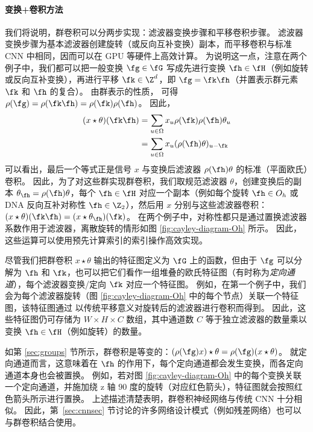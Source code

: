 \paragraph{变换+卷积方法}
我们将说明，群卷积可以分两步实现：滤波器变换步骤和平移卷积步骤。
滤波器变换步骤为基本滤波器创建旋转（或反向互补变换）副本，而平移卷积与标准 CNN 中相同，因而可以在 GPU 等硬件上高效计算。%
为说明这一点，注意在两个例子中，我们都可以把一般变换 $\fg \in \fG$ 写成先进行变换 $\fh \in \fH$（例如旋转或反向互补变换），再进行平移 $\fk \in \Z^d$，即 $\fg = \fk \fh$（并置表示群元素 $\fk$ 和 $\fh$ 的复合）。
由群表示的性质，%
可得 $\rho(\fg) = \rho(\fk \fh) = \rho(\fk) \rho(\fh)$。
因此，%
\begin{equation}
    \begin{aligned}
        (x\star \theta )(\fk \fh) 
        &=
        \sum_{u \in \Omega} x_u \rho(\fk) \rho(\fh) \theta_{u} \\
        &=
        \sum_{u \in \Omega} x_u (\rho(\fh) \theta)_{u - \fk}
    \end{aligned}
\end{equation}
可以看出，最后一个等式正是信号 $x$ 与变换后滤波器 $\rho(\fh) \theta$ 的标准（平面欧氏）卷积。
因此，为了对这些群实现群卷积，我们取规范滤波器 $\theta$，创建变换后的副本 $\theta_\fh = \rho(\fh) \theta$，每个 $\fh \in \fH$ 对应一个副本（例如每个旋转 $\fh \in O_h$ 或 DNA 反向互补对称性 $\fh \in \Z_2$），然后用 $x$ 分别与这些滤波器卷积：$(x\star \theta )(\fk \fh)  = (x\star \theta_{\fh} )(\fk)$。
在两个例子中，对称性都只是通过置换滤波器系数作用于滤波器，离散旋转的情形如图 \ref{fig:cayley-diagram-Oh} 所示。
因此，这些运算可以使用预先计算索引的索引操作高效实现。


尽管我们把群卷积 $x \star \theta$ 输出的特征图定义为 $\fG$ 上的函数，但由于 $\fg$ 可以分解为 $\fh$ 和 $\fk$，也可以把它们看作一组堆叠的欧氏特征图（有时称为\emph{定向通道}），每个滤波器变换/定向 $\fk$ 对应一个特征图。
例如，在第一个例子中，我们会为每个滤波器旋转（图 \ref{fig:cayley-diagram-Oh} 中的每个节点）关联一个特征图，该特征图通过
以传统平移意义对旋转后的滤波器进行卷积而得到。
因此，这些特征图仍可存储为 $W \times H \times C$ 数组，其中通道数 $C$ 等于独立滤波器的数量乘以变换 $\fh \in \fH$（例如旋转）的数量。

如第 \ref{sec:groups} 节所示，群卷积是等变的：$(\rho(\fg) x) \star \theta = \rho(\fg) (x \star \theta)$。
就定向通道而言，这意味着在 $\fh$ 的作用下，每个定向通道都会发生变换，而各定向通道本身也会被置换。
例如，若对图 \ref{fig:cayley-diagram-Oh} 中的每个变换关联一个定向通道，并施加绕 z 轴 $90$ 度的旋转（对应红色箭头），特征图就会按照红色箭头所示进行置换。
%
上述描述清楚表明，群卷积神经网络与传统 CNN 十分相似。
因此，第~\ref{sec:cnnsec} 节讨论的许多网络设计模式（例如残差网络）也可以与群卷积结合使用。




